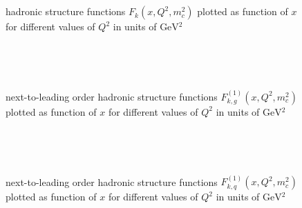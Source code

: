 \pagebreak
\begin{figure}[ht!]
\centering
\begin{subfigure}[t]{\textwidth}
	
\end{subfigure}\\%
\begin{subfigure}[t]{\textwidth}
	
\end{subfigure}\\%
\begin{subfigure}[t]{\textwidth}
	
\end{subfigure}
\caption{hadronic structure functions $F_{k}(x,Q^2,m_c^2)$ plotted as function of $x$ for different values of $Q^2$ in units of $\si{\GeV^2}$}\label{fig:F001}
\end{figure}

\pagebreak
\begin{figure}[ht!]
\centering
\begin{subfigure}[t]{\textwidth}
	
\end{subfigure}\\%
\begin{subfigure}[t]{\textwidth}
	
\end{subfigure}\\%
\begin{subfigure}[t]{\textwidth}
	
\end{subfigure}
\caption{next-to-leading order hadronic structure functions $F_{k,g}^{(1)}(x,Q^2,m_c^2)$ plotted as function of $x$ for different values of $Q^2$ in units of $\si{\GeV^2}$}\label{fig:Fg1}
\end{figure}

\pagebreak
\begin{figure}[ht!]
\centering
\begin{subfigure}[t]{\textwidth}
	
\end{subfigure}\\%
\begin{subfigure}[t]{\textwidth}
	
\end{subfigure}\\%
\begin{subfigure}[t]{\textwidth}
	
\end{subfigure}
\caption{next-to-leading order hadronic structure functions $F_{k,q}^{(1)}(x,Q^2,m_c^2)$ plotted as function of $x$ for different values of $Q^2$ in units of $\si{\GeV^2}$}\label{fig:Fq1}
\end{figure}

